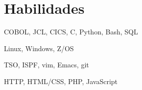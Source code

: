 \section{Habilidades}
{COBOL, JCL, CICS, C, Python, Bash, SQL}

{Linux, Windows, Z/OS}

{TSO, ISPF, vim, Emacs, git}

{HTTP, HTML/CSS, PHP, JavaScript}
